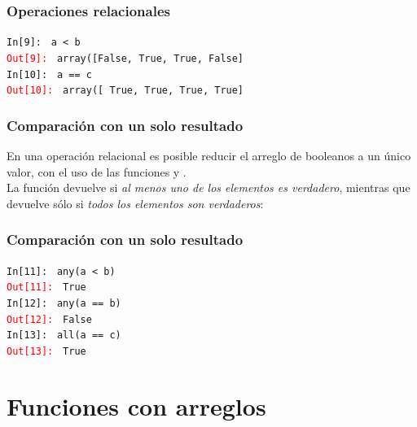 \begin{frame}[fragile]
\frametitle{Operaciones relacionales}
\begin{tcolorbox}[colback=aquamarine!30!white, colbacktitle=kellygreen, coltitle=white, fonttitle=\small, title=Dos operaciones relacionales]
\fontsize{10}{10}\selectfont
\textcolor{ao}{\texttt{In[9]: }} \texttt{a < b} \\
\medskip
\pause
\textcolor{red}{\texttt{Out[9]: }} \texttt{array([False,  True,  True, False]} \\
\medskip
\pause
\textcolor{ao}{\texttt{In[10]: }} \texttt{a == c} \\
\medskip
\pause
\textcolor{red}{\texttt{Out[10]: }} \texttt{array([ True,  True,  True,  True]}
\end{tcolorbox}
\end{frame}
\begin{frame}[fragile]
\frametitle{Comparación con un solo resultado}
En una operación relacional es posible reducir el arreglo de booleanos a un único valor, con el uso de las funciones  y .
\\
\bigskip
La función  devuelve  si \emph{al menos uno de los elementos es verdadero}, mientras que  devuelve  sólo si \emph{todos los elementos son verdaderos}:
\end{frame}
\begin{frame}[fragile]
\frametitle{Comparación con un solo resultado}
\begin{tcolorbox}[colback=aquamarine!30!white, colbacktitle=kellygreen, coltitle=white, fonttitle=\small, title=Comparación con un solo resultado]
\fontsize{10}{10}\selectfont
\textcolor{ao}{\texttt{In[11]: }} \texttt{any(a < b)} \\
\medskip
\pause
\textcolor{red}{\texttt{Out[11]: }} \texttt{True} \\
\medskip
\pause
\textcolor{ao}{\texttt{In[12]: }} \texttt{any(a == b)} \\
\medskip
\pause
\textcolor{red}{\texttt{Out[12]: }} \texttt{False} \\
\medskip
\pause
\textcolor{ao}{\texttt{In[13]: }} \texttt{all(a == c)} \\
\medskip
\pause
\textcolor{red}{\texttt{Out[13]: }} \texttt{True}
\end{tcolorbox}
\end{frame}
\section{Funciones con arreglos}
